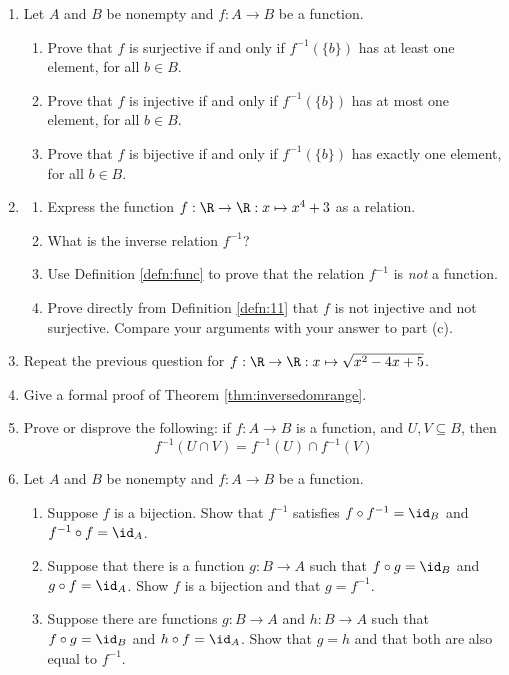 \begin{enumerate}
  \item Let $A$ and $B$ be nonempty and $f : A \to B$ be a function.
\begin{enumerate}
    \item Prove that $f$ is surjective if and only if $f^{-1}(\{b\})$ has at least one element, for all $b \in B$.
    \item Prove that $f$ is injective if and only if $f^{-1}(\{b\})$ has at most one element, for all $b \in B$.
    \item Prove that $f$ is bijective if and only if $f^{-1}(\{b\})$ has exactly one element, for all $b \in B$.
\end{enumerate}
  
  \item\begin{enumerate}
    \item Express the function $f:\R\to\R:x\mapsto x^4+3$ as a relation.
    \item What is the inverse relation $f^{-1}$?
    \item Use Definition \ref{defn:func} to prove that the relation $f^{-1}$ is \emph{not} a function.
    \item Prove directly from Definition \ref{defn:11} that $f$ is not injective and not surjective. Compare your arguments with your answer to part (c).
  \end{enumerate}
  
  \item Repeat the previous question for $f:\R\to\R:x\mapsto \sqrt{x^2-4x+5}$.
  
  \item Give a formal proof of Theorem \ref{thm:inversedomrange}.
  
  \item Prove or disprove the following: if $f:A\to B$ is a function, and $U,V\subseteq B$, then
  \[f^{-1}(U\cap V)=f^{-1}(U)\cap f^{-1}(V)\]
  
  \item Let $A$ and $B$ be nonempty and $f : A \to B$ be a function. 
\begin{enumerate}
    \item Suppose $f$ is a bijection. Show that $f^{-1}$ satisfies $f \circ f^{-1} = \id_B$ and $f^{-1} \circ f = \id_A$.
    \item Suppose that there is a function $g : B \to A$ such that $f \circ g = \id_B$ and $g \circ f = \id_A$. Show $f$ is a bijection and that $g = f^{-1}$.
    \item Suppose there are functions $g : B \to A$ and $h : B \to A$ such that $f \circ g = \id_B$ and $h \circ f = \id_A$. Show that $g = h$ and that both are also equal to $f^{-1}$.
\end{enumerate}


\end{enumerate}
